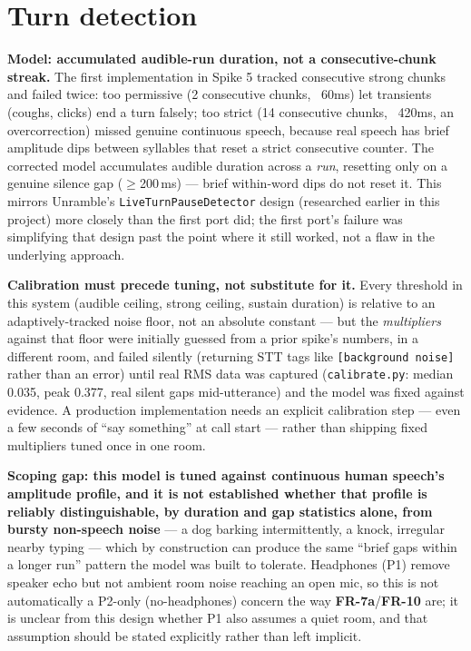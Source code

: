 \documentclass[a4paper,11pt]{report}
\newcommand{\fr}[1]{\textbf{FR-#1}}
\begin{document}
\section{Turn detection}
\label{sec:design-turn}

\textbf{Model: accumulated audible-run duration, not a consecutive-chunk
streak.} The first implementation in Spike 5 tracked consecutive strong
chunks and failed twice: too permissive (2 consecutive chunks, ~60ms) let
transients (coughs, clicks) end a turn falsely; too strict (14
consecutive chunks, ~420ms, an overcorrection) missed genuine continuous
speech, because real speech has brief amplitude dips between syllables
that reset a strict consecutive counter. The corrected model accumulates
audible duration across a \emph{run}, resetting only on a genuine silence
gap ($\geq$200\,ms) --- brief within-word dips do not reset it. This
mirrors Unramble's \texttt{LiveTurnPauseDetector} design (researched
earlier in this project) more closely than the first port did; the first
port's failure was simplifying that design past the point where it still
worked, not a flaw in the underlying approach.

\textbf{Calibration must precede tuning, not substitute for it.} Every
threshold in this system (audible ceiling, strong ceiling, sustain
duration) is relative to an adaptively-tracked noise floor, not an
absolute constant --- but the \emph{multipliers} against that floor were
initially guessed from a prior spike's numbers, in a different room, and
failed silently (returning STT tags like \texttt{[background noise]}
rather than an error) until real RMS data was captured
(\texttt{calibrate.py}: median 0.035, peak 0.377, real silent gaps
mid-utterance) and the model was fixed against evidence. A production
implementation needs an explicit calibration step --- even a few seconds
of ``say something'' at call start --- rather than shipping fixed
multipliers tuned once in one room.

\textbf{Scoping gap: this model is tuned against continuous human
speech's amplitude profile, and it is not established whether that
profile is reliably distinguishable, by duration and gap statistics
alone, from bursty non-speech noise} --- a dog barking intermittently, a
knock, irregular nearby typing --- which by construction can produce the
same ``brief gaps within a longer run'' pattern the model was built to
tolerate. Headphones (P1) remove speaker echo but not ambient room noise
reaching an open mic, so this is not automatically a P2-only
(no-headphones) concern the way \fr{7a}/\fr{10} are; it is unclear from
this design whether P1 also assumes a quiet room, and that assumption
should be stated explicitly rather than left implicit.
\end{document}
